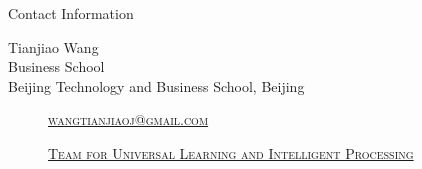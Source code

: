 \documentclass[
 size=14pt,
 paper=smartboard,  %
 mode=present, 		%
 display=slides, 	%
 style=tuliplab,  	%
 pauseslide,
 fleqn,leqno]{powerdot}
\begin{document}
\begin{wideslide}[toc=,bm=]{Contact Information}
\centering
{}
\twocolumn[
lcolwidth=0.35\linewidth,
rcolwidth=0.65\linewidth
]
{
}
{
Tianjiao Wang\\
Business School\\
Beijing Technology and Business School, Beijing
\begin{description}
 \item[\textcolor{orange}{\faEnvelope}] \href{mailto:wangtianjiaoj@gmail.com}
 {\textsc{\footnotesize{wangtianjiaoj@gmail.com}}}

 \item[\textcolor{orange}{\faHome}] \href{http://www.tulip.org.au}
 {\textsc{\footnotesize{Team for Universal Learning and Intelligent Processing}}}
\end{description}
}
\end{wideslide}
\end{document}
